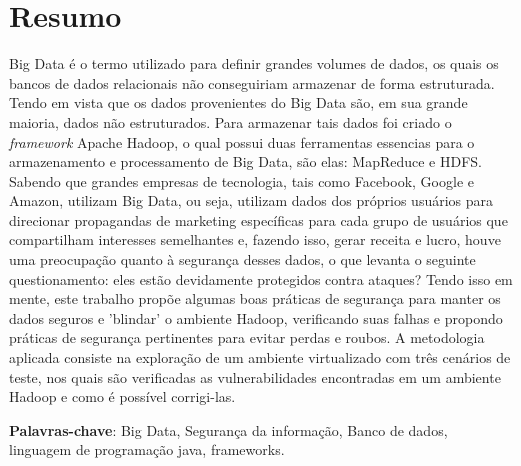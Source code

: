 \chapter*{Resumo}

\noindent Big Data é o termo utilizado para definir grandes volumes de dados, os quais os bancos de dados relacionais não conseguiriam armazenar de forma estruturada. Tendo em vista que os dados provenientes do Big Data são, em sua grande maioria, dados não estruturados. Para armazenar tais dados foi criado o \textit{framework} Apache Hadoop, o qual possui duas ferramentas essencias para o armazenamento e processamento de Big Data, são elas: MapReduce e HDFS. Sabendo que grandes empresas de tecnologia, tais como Facebook, Google e Amazon, utilizam Big Data, ou seja, utilizam dados dos próprios usuários para direcionar propagandas de marketing específicas para cada grupo de usuários que compartilham interesses semelhantes e, fazendo isso, gerar receita e lucro, houve uma preocupação quanto à segurança desses dados, o que levanta o seguinte questionamento: eles estão devidamente protegidos contra ataques? Tendo isso em mente, este trabalho propõe algumas boas práticas de segurança para manter os dados seguros e 'blindar' o ambiente Hadoop, verificando suas falhas e propondo práticas de segurança pertinentes para evitar perdas e roubos. A metodologia aplicada consiste na exploração de um ambiente virtualizado com três cenários de teste, nos quais são verificadas as vulnerabilidades encontradas em um ambiente Hadoop e como é possível corrigi-las.

\vspace{1.5ex}

{\bf Palavras-chave}: Big Data, Segurança da informação, 
Banco de dados, linguagem de programação java, frameworks.
